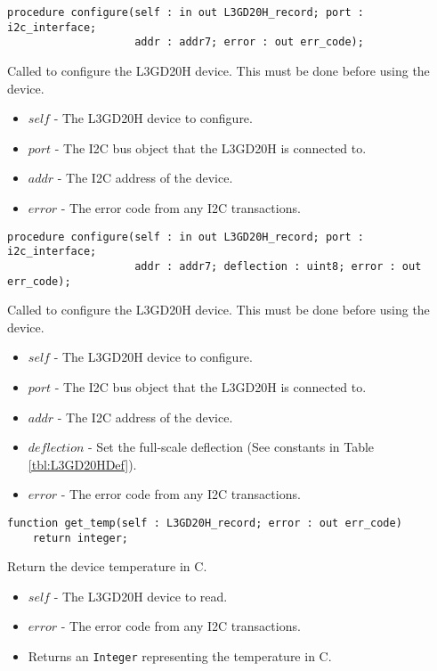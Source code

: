 \documentclass[10pt, openany]{book}
\newcommand{\indexfunc}[1]{\index[func]{#1}}
\newcommand{\datatype}[1]{\texttt{#1}}
\begin{document}
\begin{lstlisting}
procedure configure(self : in out L3GD20H_record; port : i2c_interface;
                    addr : addr7; error : out err_code);
\end{lstlisting}
\indexfunc{configure}
Called to configure the L3GD20H device.  This must be done before using the device.
\begin{itemize}
  \item $self$ - The L3GD20H device to configure.
  \item $port$ - The I2C bus object that the L3GD20H is connected to.
  \item $addr$ - The I2C address of the device.
  \item $error$ - The error code from any I2C transactions.
\end{itemize}

\begin{lstlisting}
procedure configure(self : in out L3GD20H_record; port : i2c_interface;
                    addr : addr7; deflection : uint8; error : out err_code);
\end{lstlisting}
\indexfunc{configure}
Called to configure the L3GD20H device.  This must be done before using the device.
\begin{itemize}
  \item $self$ - The L3GD20H device to configure.
  \item $port$ - The I2C bus object that the L3GD20H is connected to.
  \item $addr$ - The I2C address of the device.
  \item $deflection$ - Set the full-scale deflection (See constants in Table \ref{tbl:L3GD20HDef}).
  \item $error$ - The error code from any I2C transactions.
\end{itemize}

\begin{lstlisting}
function get_temp(self : L3GD20H_record; error : out err_code)
    return integer;
\end{lstlisting}
\indexfunc{get\_temp}
Return the device temperature in \degree{}C.
\begin{itemize}
  \item $self$ - The L3GD20H device to read.
  \item $error$ - The error code from any I2C transactions.
  \item Returns an \datatype{Integer} representing the temperature in \degree{}C.
\end{itemize}
\end{document}
